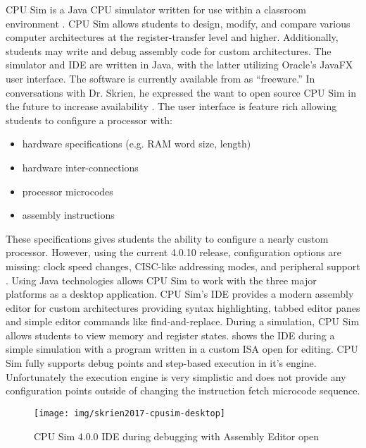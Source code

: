 CPU Sim is a Java CPU simulator written for use within a classroom environment \cite{Skrien2001}. CPU Sim allows students to design, modify, and compare various computer architectures at the register-transfer level and higher. Additionally, students may write and debug assembly code for custom architectures. The simulator and IDE are written in Java, with the latter utilizing Oracle's JavaFX user interface. The software is currently available from \cite{Skrien2017} as ``freeware.'' In conversations with Dr. Skrien, he expressed the want to open source CPU Sim in the future to increase availability \cite{Skrien2016}. The user interface is feature rich allowing students to configure a processor with:
\begin{itemize}
    \item hardware specifications (e.g. RAM word size, length)
    \item hardware inter-connections
    \item processor microcodes
    \item assembly instructions
\end{itemize} 
These specifications gives students the ability to configure a nearly custom processor. However, using the current 4.0.10 release, configuration options are missing: clock speed changes, CISC-like addressing modes, and peripheral support
\cite{Skrien2017}. Using Java technologies allows CPU Sim to work with the three major platforms as a desktop application. CPU Sim's IDE provides a modern assembly editor for custom architectures providing syntax highlighting, tabbed editor panes and simple editor commands like find-and-replace. During a simulation, CPU Sim allows students to view memory and register states.  shows the IDE during a simple simulation with a program written in a custom ISA open for editing. CPU Sim fully supports debug points and step-based execution in it's engine. Unfortunately the execution engine is very simplistic and does not provide any configuration points outside of changing the instruction fetch microcode sequence. 

\begin{figure}[t!]
    \centering
    \texttt{[image: img/skrien2017-cpusim-desktop]}
    \caption{CPU Sim 4.0.0 IDE during debugging with Assembly Editor open \cite{Skrien2017}}
    \label{fig:skrien2017-cpusim-desktop}
\end{figure}

